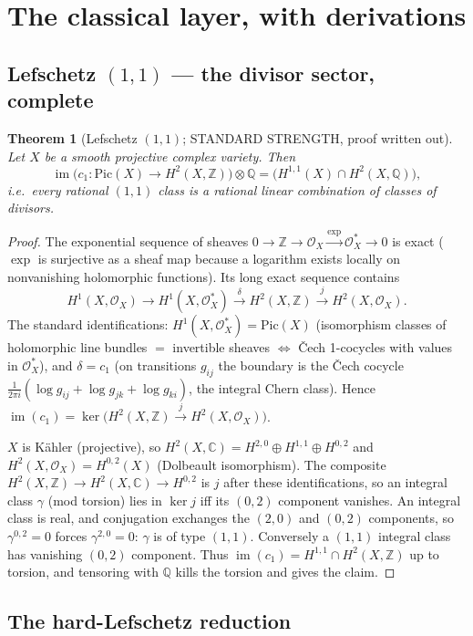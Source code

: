 \documentclass[11pt]{article}
\newtheorem{theorem}{Theorem}
\newcommand{\Oo}{\mathcal O}
\newcommand{\im}{\operatorname{im}}
\newcommand{\C}{\mathbb C}
\newcommand{\Z}{\mathbb Z}
\newcommand{\Q}{\mathbb Q}
\begin{document}
\section{The classical layer, with derivations}

\subsection{Lefschetz $(1,1)$ --- the divisor sector, complete}

\begin{theorem}[Lefschetz $(1,1)$; STANDARD STRENGTH, proof written out]
Let $X$ be a smooth projective complex variety. Then
\[
\im\big(c_1\colon\mathrm{Pic}(X)\to H^2(X,\Z)\big)\otimes\Q
=\big(H^{1,1}(X)\cap H^2(X,\Q)\big),
\]
i.e.\ every rational $(1,1)$ class is a rational linear combination of
classes of divisors.
\end{theorem}

\begin{proof}
The exponential sequence of sheaves
$0\to\Z\to\Oo_X\xrightarrow{\exp}\Oo_X^*\to0$ is exact ($\exp$ is
surjective as a sheaf map because a logarithm exists locally on
nonvanishing holomorphic functions). Its long exact sequence contains
\[
H^1(X,\Oo_X)\to H^1(X,\Oo_X^*)\xrightarrow{\ \delta\ }H^2(X,\Z)
\xrightarrow{\ j\ }H^2(X,\Oo_X).
\]
The standard identifications: $H^1(X,\Oo_X^*)=\mathrm{Pic}(X)$
(isomorphism classes of holomorphic line bundles $=$ invertible sheaves
$\Leftrightarrow$ \v{C}ech 1-cocycles with values in $\Oo_X^*$), and
$\delta=c_1$ (on transitions $g_{ij}$ the boundary is the \v{C}ech
cocycle $\frac{1}{2\pi i}(\log g_{ij}+\log g_{jk}+\log g_{ki})$, the
integral Chern class). Hence
$\im(c_1)=\ker\big(H^2(X,\Z)\xrightarrow{j}H^2(X,\Oo_X)\big)$.

$X$ is K\"ahler (projective), so
$H^2(X,\C)=H^{2,0}\oplus H^{1,1}\oplus H^{0,2}$ and
$H^2(X,\Oo_X)=H^{0,2}(X)$ (Dolbeault isomorphism). The composite
$H^2(X,\Z)\to H^2(X,\C)\to H^{0,2}$ is $j$ after these
identifications, so an integral class $\gamma$ (mod torsion) lies in
$\ker j$ iff its $(0,2)$ component vanishes. An integral class is real,
and conjugation exchanges the $(2,0)$ and $(0,2)$ components, so
$\gamma^{0,2}=0$ forces $\gamma^{2,0}=0$: $\gamma$ is of type
$(1,1)$. Conversely a $(1,1)$ integral class has vanishing $(0,2)$
component. Thus
$\im(c_1)=H^{1,1}\cap H^2(X,\Z)$ up to torsion, and tensoring with
$\Q$ kills the torsion and gives the claim.
\end{proof}

\subsection{The hard-Lefschetz reduction}
\end{document}
